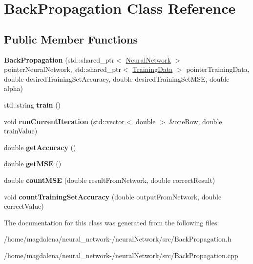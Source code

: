 \hypertarget{classBackPropagation}{}\section{Back\+Propagation Class Reference}
\label{classBackPropagation}
\subsection*{Public Member Functions}
\begin{DoxyCompactItemize}
\item 
\mbox{\label{classBackPropagation_a57ed1352beb65c4411711b2666b4364f}} 
{\bfseries Back\+Propagation} (std\+::shared\+\_\+ptr$<$ \hyperlink{classNeuralNetwork}{Neural\+Network} $>$ pointer\+Neural\+Network, std\+::shared\+\_\+ptr$<$ \hyperlink{classTrainingData}{Training\+Data} $>$ pointer\+Training\+Data, double desired\+Training\+Set\+Accuracy, double desired\+Training\+Set\+M\+SE, double alpha)
\item 
\mbox{\label{classBackPropagation_a5ade83ce04d64e7957e696c562ac0696}} 
std\+::string {\bfseries train} ()
\item 
\mbox{\label{classBackPropagation_af3c286055eaee6170f7563906f2fd988}} 
void {\bfseries run\+Current\+Iteration} (std\+::vector$<$ double $>$ \&one\+Row, double train\+Value)
\item 
\mbox{\label{classBackPropagation_aa7409190b35e26a174421cd8208d8c86}} 
double {\bfseries get\+Accuracy} ()
\item 
\mbox{\label{classBackPropagation_a3e5c71db8020ee9b9f4e73c483aeecc9}} 
double {\bfseries get\+M\+SE} ()
\item 
\mbox{\label{classBackPropagation_a671e9f4b4b8bc9ee469aef429515e5b5}} 
double {\bfseries count\+M\+SE} (double result\+From\+Network, double correct\+Result)
\item 
\mbox{\label{classBackPropagation_aba3f3d3f4d9942a6a2a8b78b81a085d0}} 
void {\bfseries count\+Training\+Set\+Accuracy} (double output\+From\+Network, double correct\+Value)
\end{DoxyCompactItemize}


The documentation for this class was generated from the following files\+:\begin{DoxyCompactItemize}
\item 
/home/magdalena/neural\+\_\+network-\//neural\+Network/src/Back\+Propagation.\+h\item 
/home/magdalena/neural\+\_\+network-\//neural\+Network/src/Back\+Propagation.\+cpp\end{DoxyCompactItemize}

